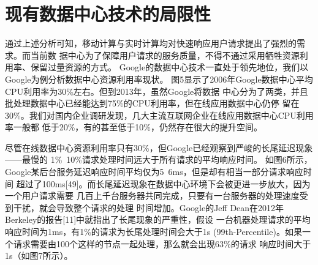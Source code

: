 

\section{现有数据中心技术的局限性}

通过上述分析可知，移动计算与实时计算均对快速响应用户请求提出了强烈的需求。而当前数
据中心为了保障用户请求的服务质量，不得不通过采用牺牲资源利用率、保留过量资源的方式。
Google的数据中心技术一直处于领先地位，我们以Google为例分析数据中心资源利用率现状。
图5显示了2006年Google数据中心平均CPU利用率为30\%左右。但到2013年，虽然Google将数据
中心分为了两类，并且批处理数据中心已经能达到75\%的CPU利用率，但在线应用数据中心仍停
留在30\%。我们对国内企业调研发现，几大主流互联网企业在线应用数据中心CPU利用率一般都
低于20\%，有的甚至低于10\%，仍然存在很大的提升空间。

尽管在线数据中心资源利用率只有30\%，但Google已经观察到严峻的长尾延迟现象——最慢的
1\%~10\%请求处理时间远大于所有请求的平均响应时间。
如图6所示，Google某后台服务延迟响应时间平均仅为5~6ms，但是却有相当一部分请求响应时间
超过了100ms[49]。而长尾延迟现象在数据中心环境下会被更进一步放大，因为一个用户请求需要
几百上千台服务器共同完成，只要有一台服务器的处理速度受到干扰，就会导致整个请求的处理
时间增加。Google的Jeff Dean在2012年Berkeley的报告[11]中就指出了长尾现象的严重性，假设
一台机器处理请求的平均响应时间为1ms，有1\%的请求为长尾处理时间会大于1s 
(99th-Percentile)。如果一个请求需要由100个这样的节点一起处理，那么就会出现63\%的请求
响应时间大于1s（如图7所示）。

